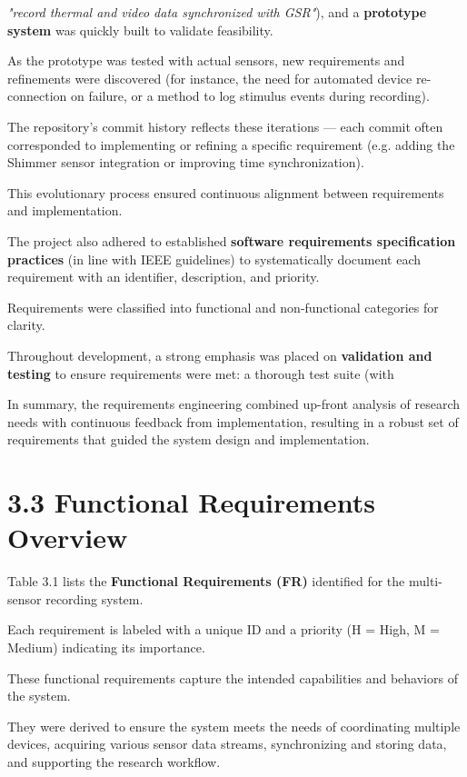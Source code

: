 \textit{"record thermal and video data synchronized with GSR"}), and a \textbf{prototype system}
 was quickly built to validate feasibility.

As the prototype was tested with actual sensors, new requirements and refinements were discovered (for instance, the need for automated device re-connection on failure, or a method to log stimulus events during recording).

The repository's commit history reflects these iterations --- each commit often corresponded to implementing or refining a specific requirement (e.g. adding the Shimmer sensor integration or improving time synchronization).

This evolutionary process ensured continuous alignment between requirements and implementation.

The project also adhered to established \textbf{software requirements specification practices}
 (in line with IEEE guidelines) to systematically document each requirement with an identifier, description, and priority.

Requirements were classified into functional and non-functional categories for clarity.

Throughout development, a strong emphasis was placed on \textbf{validation and testing}
 to ensure requirements were met: a thorough test suite (with %

In summary, the requirements engineering combined up-front analysis of research needs with continuous feedback from implementation, resulting in a robust set of requirements that guided the system design and implementation.

\section{3.3 Functional Requirements Overview}

Table 3.1 lists the \textbf{Functional Requirements (FR)}
 identified for the multi-sensor recording system.

Each requirement is labeled with a unique ID and a priority (H = High, M = Medium) indicating its importance.

These functional requirements capture the intended capabilities and behaviors of the system.

They were derived to ensure the system meets the needs of coordinating multiple devices, acquiring various sensor data streams, synchronizing and storing data, and supporting the research workflow.

